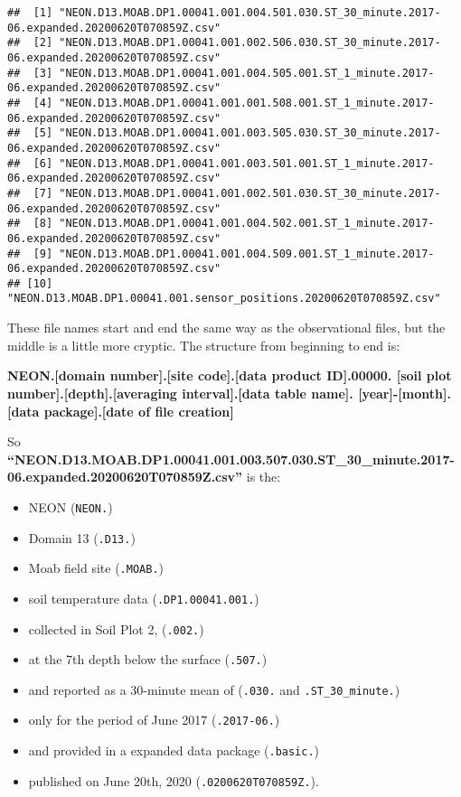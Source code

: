 \documentclass[]{book}
\providecommand{\tightlist}{%
  \setlength{\itemsep}{0pt}\setlength{\parskip}{0pt}}
\begin{document}
\begin{verbatim}
##  [1] "NEON.D13.MOAB.DP1.00041.001.004.501.030.ST_30_minute.2017-06.expanded.20200620T070859Z.csv"
##  [2] "NEON.D13.MOAB.DP1.00041.001.002.506.030.ST_30_minute.2017-06.expanded.20200620T070859Z.csv"
##  [3] "NEON.D13.MOAB.DP1.00041.001.004.505.001.ST_1_minute.2017-06.expanded.20200620T070859Z.csv" 
##  [4] "NEON.D13.MOAB.DP1.00041.001.001.508.001.ST_1_minute.2017-06.expanded.20200620T070859Z.csv" 
##  [5] "NEON.D13.MOAB.DP1.00041.001.003.505.030.ST_30_minute.2017-06.expanded.20200620T070859Z.csv"
##  [6] "NEON.D13.MOAB.DP1.00041.001.003.501.001.ST_1_minute.2017-06.expanded.20200620T070859Z.csv" 
##  [7] "NEON.D13.MOAB.DP1.00041.001.002.501.030.ST_30_minute.2017-06.expanded.20200620T070859Z.csv"
##  [8] "NEON.D13.MOAB.DP1.00041.001.004.502.001.ST_1_minute.2017-06.expanded.20200620T070859Z.csv" 
##  [9] "NEON.D13.MOAB.DP1.00041.001.004.509.001.ST_1_minute.2017-06.expanded.20200620T070859Z.csv" 
## [10] "NEON.D13.MOAB.DP1.00041.001.sensor_positions.20200620T070859Z.csv"
\end{verbatim}

These file names start and end the same way as the observational files, but the
middle is a little more cryptic. The structure from beginning to end is:

\textbf{NEON.{[}domain number{]}.{[}site code{]}.{[}data product ID{]}.00000.
{[}soil plot number{]}.{[}depth{]}.{[}averaging interval{]}.{[}data table name{]}.
{[}year{]}-{[}month{]}.{[}data package{]}.{[}date of file creation{]}}

So \textbf{``NEON.D13.MOAB.DP1.00041.001.003.507.030.ST\_30\_minute.2017-06.expanded.20200620T070859Z.csv''} is the:

\begin{itemize}
\tightlist
\item
  NEON (\texttt{NEON.})
\item
  Domain 13 (\texttt{.D13.})
\item
  Moab field site (\texttt{.MOAB.})
\item
  soil temperature data (\texttt{.DP1.00041.001.})
\item
  collected in Soil Plot 2, (\texttt{.002.})
\item
  at the 7th depth below the surface (\texttt{.507.})
\item
  and reported as a 30-minute mean of (\texttt{.030.} and \texttt{.ST\_30\_minute.})
\item
  only for the period of June 2017 (\texttt{.2017-06.})
\item
  and provided in a expanded data package (\texttt{.basic.})
\item
  published on June 20th, 2020 (\texttt{.0200620T070859Z.}).
\end{itemize}
\end{document}
